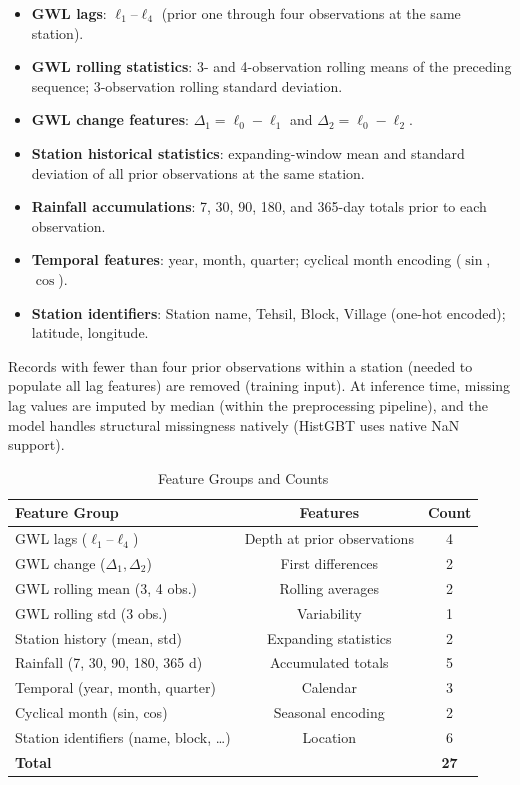 \documentclass[conference]{IEEEtran}
\begin{document}
\begin{itemize}
  \item \textbf{GWL lags}: $\ell_1$--$\ell_4$ (prior one through
        four observations at the same station).
  \item \textbf{GWL rolling statistics}: 3- and 4-observation
        rolling means of the preceding sequence;
        3-observation rolling standard deviation.
  \item \textbf{GWL change features}: $\Delta_1 = \ell_0 - \ell_1$
        and $\Delta_2 = \ell_0 - \ell_2$.
  \item \textbf{Station historical statistics}: expanding-window
        mean and standard deviation of all prior observations
        at the same station.
  \item \textbf{Rainfall accumulations}: 7, 30, 90, 180, and
        365-day totals prior to each observation.
  \item \textbf{Temporal features}: year, month, quarter;
        cyclical month encoding ($\sin$, $\cos$).
  \item \textbf{Station identifiers}: Station name, Tehsil, Block,
        Village (one-hot encoded); latitude, longitude.
\end{itemize}

Records with fewer than four prior observations within a station
(needed to populate all lag features) are removed (training input).
At inference time, missing lag values are imputed by median
(within the preprocessing pipeline), and the model handles
structural missingness natively (HistGBT uses native NaN support).

\begin{table}[h]
\caption{Feature Groups and Counts}
\label{tab:features}
\centering
\footnotesize
\begin{tabular}{lcc}
\toprule
\textbf{Feature Group} & \textbf{Features} & \textbf{Count} \\
\midrule
GWL lags ($\ell_1$--$\ell_4$) & Depth at prior observations & 4 \\
GWL change ($\Delta_1, \Delta_2$) & First differences & 2 \\
GWL rolling mean (3, 4 obs.) & Rolling averages & 2 \\
GWL rolling std (3 obs.) & Variability & 1 \\
Station history (mean, std) & Expanding statistics & 2 \\
Rainfall (7, 30, 90, 180, 365 d) & Accumulated totals & 5 \\
Temporal (year, month, quarter) & Calendar & 3 \\
Cyclical month (sin, cos) & Seasonal encoding & 2 \\
Station identifiers (name, block, \ldots) & Location & 6 \\
\midrule
\textbf{Total} & & \textbf{27} \\
\bottomrule
\end{tabular}
\end{table}
\end{document}
